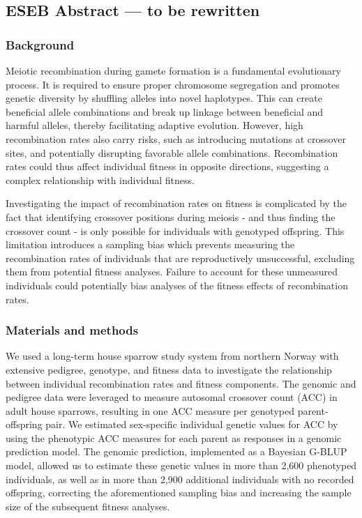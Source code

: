\documentclass[dvipsnames]{article}
\begin{document}
\selectfont


\maketitle
\newpage

\subsection*{ESEB Abstract --- to be rewritten}

\subsubsection*{Background}
Meiotic recombination during gamete formation is a fundamental evolutionary process. It is required to ensure proper chromosome segregation and promotes genetic diversity by shuffling alleles into novel haplotypes. This can create beneficial allele combinations and break up linkage between beneficial and harmful alleles, thereby facilitating adaptive evolution. However, high recombination rates also carry risks, such as introducing mutations at crossover sites, and potentially disrupting favorable allele combinations. Recombination rates could thus affect individual fitness in opposite directions, suggesting a complex relationship with individual fitness.

Investigating the impact of recombination rates on fitness is complicated by the fact that identifying crossover positions during meiosis - and thus finding the crossover count - is only possible for individuals with genotyped offspring. This limitation introduces a sampling bias which prevents measuring the recombination rates of individuals that are reproductively unsuccessful, excluding them from potential fitness analyses. Failure to account for these unmeasured individuals could potentially bias analyses of the fitness effects of recombination rates. 

\subsubsection*{Materials and methods}
We used a long-term house sparrow study system from northern Norway with extensive pedigree, genotype, and fitness data to investigate the relationship between individual recombination rates and fitness components. The genomic and pedigree data were leveraged to measure autosomal crossover count (ACC) in adult house sparrows, resulting in one ACC measure per genotyped parent-offspring pair. We estimated sex-specific individual genetic values for ACC by using the phenotypic ACC measures for each parent as responses in a genomic prediction model. The genomic prediction, implemented as a Bayesian G-BLUP model, allowed us to estimate these genetic values in more than 2,600 phenotyped individuals, as well as in more than 2,900 additional individuals with no recorded offspring, correcting the aforementioned sampling bias and increasing the sample size of the subsequent fitness analyses.
\end{document}
